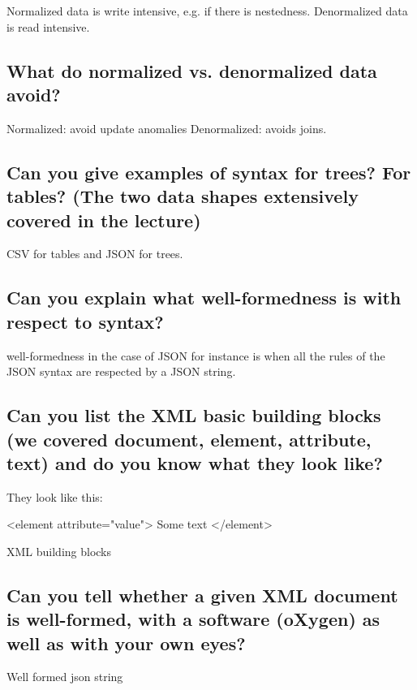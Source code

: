 \documentclass{article}
\begin{document}
Normalized data is write intensive, e.g. if there is nestedness. Denormalized data is read intensive.

\subsection{What do normalized vs. denormalized data avoid?}

Normalized: avoid update anomalies
Denormalized: avoids joins.

\subsection{Can you give examples of syntax for trees? For tables? (The two data shapes extensively covered in the lecture)}

CSV for tables and JSON for trees.


\subsection{Can you explain what well-formedness is with respect to syntax?}

well-formedness in the case of JSON for instance is when all the rules of the JSON syntax are respected by a JSON string.

\subsection{Can you list the XML basic building blocks (we covered document, element, attribute, text) and do you know what they look like?}

They look like this:
\begin{center}
\begin{listing}[!ht]
  \begin{xml}
    <element attribute="value">
    Some text
    </element>
  \end{xml}
  \caption[Test]{XML building blocks}
  \label{lst:test}
\end{listing}
\end{center}


\subsection{Can you tell whether a given XML document is well-formed, with a software (oXygen) as well as with your own eyes?}

Well formed json string
\end{document}
